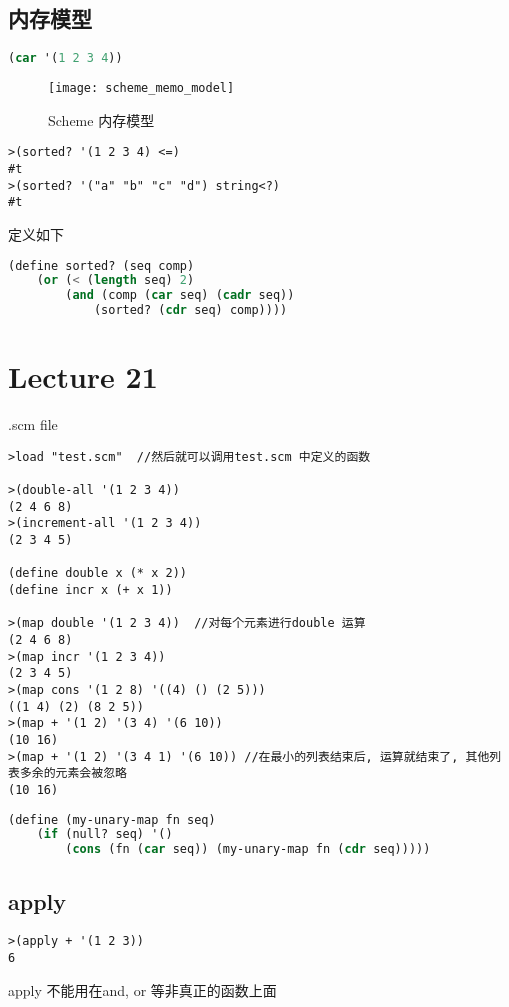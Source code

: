 \documentclass{article}
\begin{document}
\subsection{内存模型}
\begin{lstlisting}[language = Lisp]
(car '(1 2 3 4))
\end{lstlisting}
\begin{figure}[htbp]
	\centering
	\texttt{[image: scheme\_memo\_model]}\\
	\caption{Scheme 内存模型}\label{fig.scheme.memo.model}
\end{figure}


\begin{verbatim}
>(sorted? '(1 2 3 4) <=)
#t
>(sorted? '("a" "b" "c" "d") string<?)
#t
\end{verbatim}
定义如下
\begin{lstlisting}[language = Lisp]
(define sorted? (seq comp)
	(or (< (length seq) 2)
		(and (comp (car seq) (cadr seq))
			(sorted? (cdr seq) comp))))
\end{lstlisting}

\section{Lecture 21}
.scm file
\begin{verbatim}
>load "test.scm"  //然后就可以调用test.scm 中定义的函数

>(double-all '(1 2 3 4))
(2 4 6 8)
>(increment-all '(1 2 3 4))
(2 3 4 5)

(define double x (* x 2))
(define incr x (+ x 1))

>(map double '(1 2 3 4))  //对每个元素进行double 运算
(2 4 6 8)
>(map incr '(1 2 3 4))
(2 3 4 5)
>(map cons '(1 2 8) '((4) () (2 5)))
((1 4) (2) (8 2 5))
>(map + '(1 2) '(3 4) '(6 10))
(10 16)
>(map + '(1 2) '(3 4 1) '(6 10)) //在最小的列表结束后, 运算就结束了, 其他列表多余的元素会被忽略
(10 16)
\end{verbatim}

\begin{lstlisting}[language = Lisp]
(define (my-unary-map fn seq)
	(if (null? seq) '()
		(cons (fn (car seq)) (my-unary-map fn (cdr seq)))))
\end{lstlisting}

\subsection{apply}
\begin{verbatim}
>(apply + '(1 2 3))
6
\end{verbatim}apply 不能用在and, or 等非真正的函数上面
\end{document}
